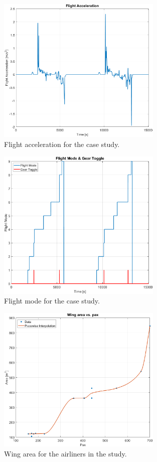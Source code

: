\documentclass[english]{kththesis}
\begin{document}
\begin{figure}[!ht]
    \centering
    \includegraphics[width=0.7\textwidth]{Epictures/FlightAcceleration.png}
    \caption{Flight acceleration for the case study.}
    \label{fig:FlightAcceleration}
\end{figure}

\begin{figure}[!ht]
    \centering
    \includegraphics[width=0.7\textwidth]{Epictures/FlightMode.png}
    \caption{Flight mode for the case study.}
    \label{fig:FlightMode}
\end{figure}

\begin{figure}[!ht]
    \centering
    \includegraphics[width=0.7\textwidth]{Epictures/WingAreavsPax.png}
    \caption{Wing area for the airliners in the study.}
    \label{fig:WingAreaPax}
\end{figure}
\end{document}
